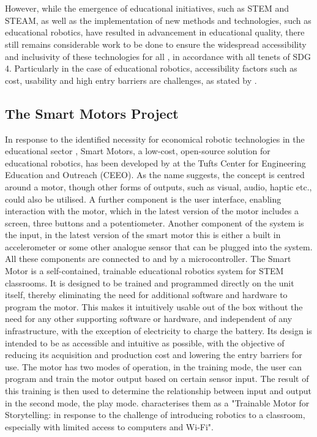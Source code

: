 \\\\
However, while the emergence of educational initiatives, such as STEM and STEAM, as well as the implementation of new methods and technologies, such as educational robotics, have resulted in advancement in educational quality, there still remains considerable work to be done to ensure the widespread accessibility and inclusivity of these technologies for all \citep{sapounidis_educational_2020}, in accordance with all tenets of SDG 4. Particularly in the case of educational robotics, accessibility factors such as cost, usability and high entry barriers are challenges, as stated by \citet{dahal_designing_2024, dahal_international_2023, johnson_implementation_2012}.

\subsection{\label{sec:intro_smp}The Smart Motors Project}%
In response to the identified necessity for economical robotic technologies in the educational sector \citep{khine_robotics_2017}, Smart Motors, a low-cost, open-source solution for educational robotics, has been developed by \citet{dahal_designing_2024} at the Tufts Center for Engineering Education and Outreach (CEEO). As the name suggests, the concept is centred around a motor, though other forms of outputs, such as visual, audio, haptic etc., could also be utilised. A further component is the user interface, enabling interaction with the motor, which in the latest version of the motor includes a screen, three buttons and a potentiometer. Another component of the system is the input, in the latest version of the smart motor this is either a built in accelerometer or some other analogue sensor that can be plugged into the system. All these components are connected to and by a microcontroller.
The Smart Motor is a self-contained, trainable educational robotics system for STEM classrooms. It is designed to be trained and programmed directly on the unit itself, thereby eliminating the need for additional software and hardware to program the motor. This makes it intuitively usable out of the box without the need for any other supporting software or hardware, and independent of any infrastructure, with the exception of electricity to charge the battery. Its design is intended to be as accessible and intuitive as possible, with the objective of reducing its acquisition and production cost and lowering the entry barriers for use. The motor has two modes of operation, in the training mode, the user can program and train the motor output based on certain sensor input. The result of this training is then used to determine the relationship between input and output in the second mode, the play mode. \citet[][p. 3]{dahal_designing_2024} characterises them as a "Trainable Motor for Storytelling: in response to the challenge of introducing robotics to a classroom, especially with limited access to computers and Wi-Fi".
